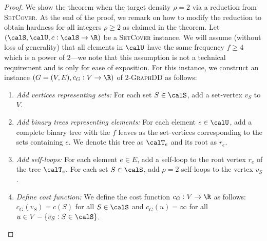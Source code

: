 \documentclass{article}
\newcommand{\densitydeletionset}{\textsc{GraphDD}\xspace}
\newcommand{\setcover}{\textsc{SetCover}\xspace}
\begin{document}
\thmDDSlognHard*
\begin{proof}We show the theorem when the target density $\rho = 2$ via a reduction from \setcover. At the end of the proof, we remark on how to modify the reduction to obtain hardness for all integers $\rho \geq 2$ as claimed in the theorem. Let $(\calS, \calU, c:\calS\rightarrow\R)$ be a \setcover instance. We will assume (without loss of generality) that all elements in $\calU$ have the same frequency $f \geq 4$ which is a power of $2$---we note that this assumption is not a technical requirement and is only for ease of exposition. For this instance, we construct an instance $(G = (V, E), c_G:V\rightarrow\R)$ of $2$-\densitydeletionset as follows:
    \begin{enumerate}
         \item \emph{Add vertices representing sets:} For each set $S\in \calS$, add a set-vertex $v_S$ to $V$.
         
        \item \emph{Add binary trees representing elements:}
        For each element $e\in \calU$, add a complete binary tree with the $f$ leaves as the set-vertices corresponding to the sets containing $e$. We denote this tree as $\calT_e$ and its root as $r_e$.




        \item \emph{Add self-loops:}
        For each element $e \in E$, add a self-loop to the root vertex $r_e$ of the tree $\calT_e$. For each set $S \in \calS$, add $\rho=2$ self-loops to the vertex $v_S$.
        
        
        \item \emph{Define cost function:} We define the cost function $c_G:V\rightarrow\R$ as follows: $c_G(v_S) = c(S)$ for all $S \in \calS$ and $c_G(u) = \infty$ for all $u \in V - \{v_S : S\in \calS\}$.
    \end{enumerate}


\end{proof}
\end{document}
